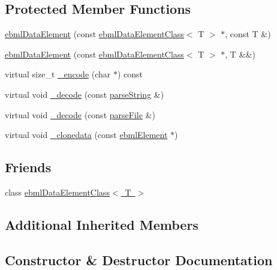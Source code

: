 \subsection*{Protected Member Functions}
\begin{DoxyCompactItemize}
\item 
\mbox{\hyperlink{classebml_1_1ebmlDataElement_a9b130669c4ed313918eb8af37f067b1d}{ebml\+Data\+Element}} (const \mbox{\hyperlink{classebml_1_1ebmlDataElementClass}{ebml\+Data\+Element\+Class}}$<$ T $>$ $\ast$, const T \&)
\item 
\mbox{\hyperlink{classebml_1_1ebmlDataElement_a6006b80fd6faec7d0cc46a597c7073dc}{ebml\+Data\+Element}} (const \mbox{\hyperlink{classebml_1_1ebmlDataElementClass}{ebml\+Data\+Element\+Class}}$<$ T $>$ $\ast$, T \&\&)
\item 
virtual size\+\_\+t \mbox{\hyperlink{classebml_1_1ebmlDataElement_aabb10c15457709e0aa2c1f5744ddbfff}{\+\_\+encode}} (char $\ast$) const
\item 
virtual void \mbox{\hyperlink{classebml_1_1ebmlDataElement_a8a3c04faedabb3667e6750fd2d563c59}{\+\_\+decode}} (const \mbox{\hyperlink{classebml_1_1parseString}{parse\+String}} \&)
\item 
virtual void \mbox{\hyperlink{classebml_1_1ebmlDataElement_a54798682308de38d13ebf05ca4f6df7e}{\+\_\+decode}} (const \mbox{\hyperlink{classebml_1_1parseFile}{parse\+File}} \&)
\item 
virtual void \mbox{\hyperlink{classebml_1_1ebmlDataElement_abc9e99cdc566a08b2334e55374dc5f5a}{\+\_\+clonedata}} (const \mbox{\hyperlink{classebml_1_1ebmlElement}{ebml\+Element}} $\ast$)
\end{DoxyCompactItemize}
\subsection*{Friends}
\begin{DoxyCompactItemize}
\item 
class \mbox{\hyperlink{classebml_1_1ebmlDataElement_ae0bbbe5e14590a39747036bca3911c95}{ebml\+Data\+Element\+Class$<$ T $>$}}
\end{DoxyCompactItemize}
\subsection*{Additional Inherited Members}


\subsection{Constructor \& Destructor Documentation}
\mbox{\label{classebml_1_1ebmlDataElement_a9b130669c4ed313918eb8af37f067b1d}} 
